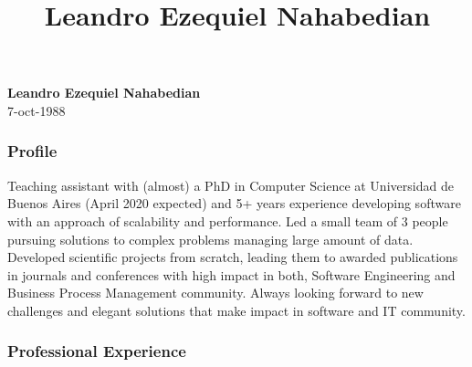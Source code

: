 \documentclass[10pt]{article}
\title{\bfseries Leandro Ezequiel Nahabedian}
\author{}
\date{}
\begin{document}
\begin{center}
{\large \textbf{Leandro Ezequiel Nahabedian}}\\%
7-oct-1988

\end{center}

\subsubsection*{Profile}
\small

Teaching assistant with (almost) a PhD in Computer Science at Universidad 
de Buenos Aires (April 2020 expected) and 5+ years experience developing 
software with an approach of scalability and 
performance. Led a small team of 3 people pursuing solutions to complex 
problems managing large amount of data. Developed scientific projects from 
scratch, leading them to 
awarded publications in journals and conferences with high impact in both, 
Software Engineering and Business Process Management community.
Always looking forward to new challenges and elegant solutions that make impact 
in software and IT community.

\vspace{-0.2cm}
\subsubsection*{Professional Experience}
\end{document}
